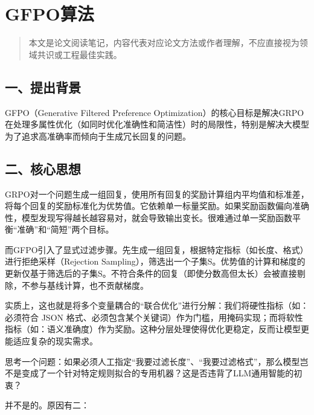 \setcounter{section}{3}

\hypertarget{gfpoux7b97ux6cd5}{%
\section{GFPO算法}\label{gfpoux7b97ux6cd5}}

\begin{quote}
本文是论文阅读笔记，内容代表对应论文方法或作者理解，不应直接视为领域共识或工程最佳实践。
\end{quote}

\hypertarget{ux4e00ux63d0ux51faux80ccux666f-2}{%
\subsection{一、提出背景}\label{ux4e00ux63d0ux51faux80ccux666f-2}}

GFPO（Generative Filtered Preference Optimization）的核心目标是解决GRPO在处理多属性优化（如同时优化准确性和简洁性）时的局限性，特别是解决大模型为了追求高准确率而倾向于生成冗长回复的问题。

\hypertarget{ux4e8cux6838ux5fc3ux601dux60f3-2}{%
\subsection{二、核心思想}\label{ux4e8cux6838ux5fc3ux601dux60f3-2}}

GRPO对一个问题生成一组回复，使用所有回复的奖励计算组内平均值和标准差，将每个回复的奖励标准化为优势值。它依赖单一标量奖励。如果奖励函数偏向准确性，模型发现写得越长越容易对，就会导致输出变长。很难通过单一奖励函数平衡``准确''和``简短''两个目标。

而GFPO引入了显式过滤步骤。先生成一组回复，根据特定指标（如长度、格式）进行拒绝采样（Rejection Sampling），筛选出一个子集S。优势值的计算和梯度的更新仅基于筛选后的子集S。不符合条件的回复（即使分数高但太长）会被直接剔除，不参与基线计算，也不贡献梯度。

实质上，这也就是将多个变量耦合的``联合优化''进行分解：我们将硬性指标（如：必须符合 JSON 格式、必须包含某个关键词）作为门槛，用掩码实现；而将软性指标（如：语义准确度）作为奖励。这种分层处理使得优化更稳定，反而让模型更能适应复杂的现实需求。

思考一个问题：如果必须人工指定``我要过滤长度''、``我要过滤格式''，那么模型岂不是变成了一个针对特定规则拟合的专用机器？这是否违背了LLM通用智能的初衷？

并不是的。原因有二：

